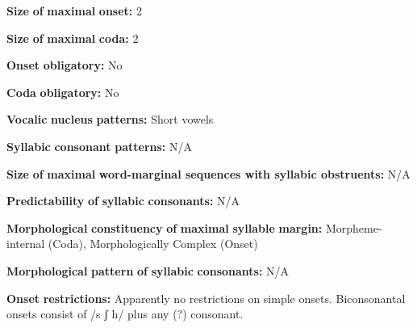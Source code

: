 \documentclass[output=paper]{langsci/langscibook}
\begin{document}
\begin{styleBody}
\textbf{Size} \textbf{of} \textbf{maximal} \textbf{onset:} 2
\end{styleBody}

\begin{styleBody}
\textbf{Size} \textbf{of} \textbf{maximal} \textbf{coda:} 2
\end{styleBody}

\begin{styleBody}
\textbf{Onset} \textbf{obligatory:} No
\end{styleBody}

\begin{styleBody}
\textbf{Coda} \textbf{obligatory:} No
\end{styleBody}

\begin{styleBody}
\textbf{Vocalic} \textbf{nucleus} \textbf{patterns:} Short vowels
\end{styleBody}

\begin{styleBody}
\textbf{Syllabic} \textbf{consonant} \textbf{patterns:} N/A
\end{styleBody}

\begin{styleBody}
\textbf{Size} \textbf{of} \textbf{maximal} \textbf{word{}-marginal sequences with syllabic obstruents:} N/A
\end{styleBody}

\begin{styleBody}
\textbf{Predictability} \textbf{of} \textbf{syllabic} \textbf{consonants:} N/A
\end{styleBody}

\begin{styleBody}
\textbf{Morphological} \textbf{constituency} \textbf{of} \textbf{maximal} \textbf{syllable} \textbf{margin:} Morpheme-internal (Coda), Morphologically Complex (Onset)
\end{styleBody}

\begin{styleBody}
\textbf{Morphological} \textbf{pattern} \textbf{of} \textbf{syllabic} \textbf{consonants:} N/A
\end{styleBody}

\begin{styleBody}
\textbf{Onset} \textbf{restrictions:} Apparently no restrictions on simple onsets. Biconsonantal onsets consist of /s ʃ h/ plus any (?) consonant.
\end{styleBody}
\end{document}

